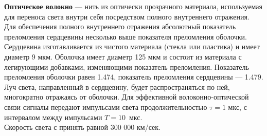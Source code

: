 
\textbf{Оптическое волокно} — нить из оптически прозрачного материала, используемая для переноса света 
внутри себя посредством полного внутреннего отражения. Для обеспечения полного внутреннего отражения абсолютный 
показатель преломления сердцевины несколько выше показателя преломления оболочки. Сердцевина изготавливается из 
чистого материала (стекла или пластика) и имеет диаметр 9 мкм. Оболочка имеет диаметр 125 мкм и состоит из 
материала с легирующими добавками, изменяющими показатель преломления. Показатель преломления оболочки равен 1.474, 
показатель преломления сердцевины — 1.479. Луч света, направленный в сердцевину, будет распространяться по ней, 
многократно отражаясь от оболочки. Для эффективной волоконно-оптической связи сигналы передают импульсами света 
продолжительностью $\tau = 1$ мкс, с интервалом между импульсами $T = 10$~мкс.\\
Скорость света с принять равной 300 000 км/сек.
